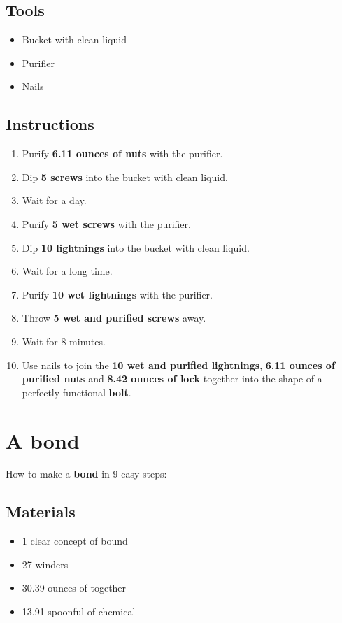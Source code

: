 \documentclass{article}
\begin{document}
\subsection{Tools}\begin{itemize}
\item 
Bucket with clean liquid
\item 
Purifier
\item 
Nails
\end{itemize}
\subsection{Instructions}\begin{enumerate}
\item 
Purify \textbf{6.11 ounces of nuts} with the purifier.
\item 
Dip \textbf{5 screws} into the bucket with clean liquid.
\item 
Wait for a day.
\item 
Purify \textbf{5 wet screws} with the purifier.
\item 
Dip \textbf{10 lightnings} into the bucket with clean liquid.
\item 
Wait for a long time.
\item 
Purify \textbf{10 wet lightnings} with the purifier.
\item 
Throw \textbf{5 wet and purified screws} away.
\item 
Wait for 8 minutes.
\item 
Use nails to join the \textbf{10 wet and purified lightnings}, \textbf{6.11 ounces of purified nuts} and \textbf{8.42 ounces of lock} together into the shape of a perfectly functional \textbf{bolt}.
\end{enumerate}
\newpage
\section{A bond}How to make a \textbf{bond} in 9 easy steps:

\subsection{Materials}\begin{itemize}
\item 
1 clear concept of bound
\item 
27 winders
\item 
30.39 ounces of together
\item 
13.91 spoonful of chemical
\end{itemize}
\end{document}
